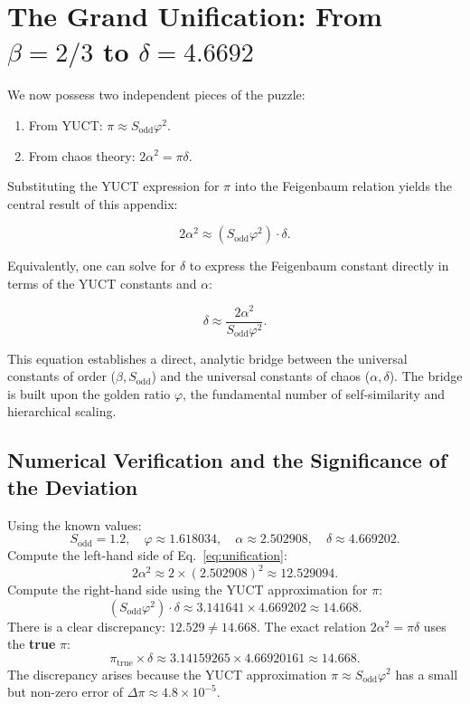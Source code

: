 \documentclass[12pt,a4paper]{article}
\begin{document}
{	\section{The Grand Unification: From \(\beta = 2/3\) to \(\delta = 4.6692\)}
	
	We now possess two independent pieces of the puzzle:
	\begin{enumerate}
		\item From YUCT: \(\pi \approx S_{\mathrm{odd}}\varphi^2\).
		\item From chaos theory: \(2\alpha^2 = \pi \delta\).
	\end{enumerate}
	
	Substituting the YUCT expression for \(\pi\) into the Feigenbaum relation yields the central result of this appendix:
	
	\begin{equation}
		\boxed{2\alpha^2 \approx (S_{\mathrm{odd}}\varphi^2) \cdot \delta}.
		\label{eq:unification}
	\end{equation}
	
	Equivalently, one can solve for \(\delta\) to express the Feigenbaum constant directly in terms of the YUCT constants and \(\alpha\):
	
	\begin{equation}
		\delta \approx \frac{2\alpha^2}{S_{\mathrm{odd}}\varphi^2}.
	\end{equation}
	
	This equation establishes a direct, analytic bridge between the universal constants of order (\(\beta, S_{\mathrm{odd}}\)) and the universal constants of chaos (\(\alpha, \delta\)). The bridge is built upon the golden ratio \(\varphi\), the fundamental number of self-similarity and hierarchical scaling.
	
	\subsection{Numerical Verification and the Significance of the Deviation}
	
	Using the known values:
	\[
	S_{\mathrm{odd}} = 1.2, \quad \varphi \approx 1.618034, \quad \alpha \approx 2.502908, \quad \delta \approx 4.669202.
	\]
	Compute the left-hand side of Eq.~\eqref{eq:unification}:
	\[
	2\alpha^2 \approx 2 \times (2.502908)^2 \approx 12.529094.
	\]
	Compute the right-hand side using the YUCT approximation for \(\pi\):
	\[
	(S_{\mathrm{odd}}\varphi^2) \cdot \delta \approx 3.141641 \times 4.669202 \approx 14.668.
	\]
	There is a clear discrepancy: \(12.529 \neq 14.668\). The exact relation \(2\alpha^2 = \pi \delta\) uses the \textbf{true} \(\pi\):
	\[
	\pi_{\mathrm{true}} \times \delta \approx 3.14159265 \times 4.66920161 \approx 14.668.
	\]
	The discrepancy arises because the YUCT approximation \(\pi \approx S_{\mathrm{odd}}\varphi^2\) has a small but non-zero error of \(\Delta\pi \approx 4.8\times10^{-5}\).
	
}
\end{document}
